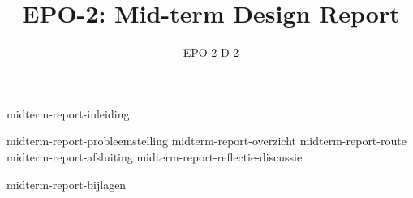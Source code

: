 \documentclass{report}
\title{EPO-2: Mid-term Design Report}
\author{EPO-2 D-2}
\begin{document}
\maketitle
\newpage
{}

{midterm-report-inleiding}
\tableofcontents

\newpage
{}

{midterm-report-probleemstelling}
{midterm-report-overzicht}
{midterm-report-route}
{midterm-report-afsluiting}
{midterm-report-reflectie-discussie}

\newpage
{}

\printbibliography
{midterm-report-bijlagen}
\end{document}
